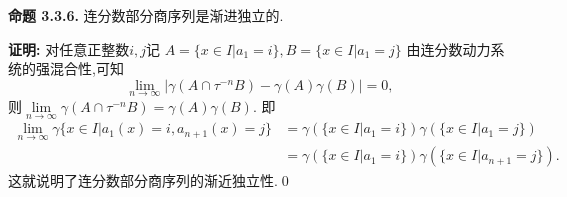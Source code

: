 \textbf{命题 3.3.6.  }\textsuperscript{\cite{Liu_Peng}}
连分数部分商序列是渐进独立的.
\par
\textbf{证明:  }
对任意正整数$i,j$记
$A=\{x\in I|a_1=i\},B=\{x\in I|a_1=j\}$
由连分数动力系统的强混合性,可知
$$\lim\limits_{n\to \infty}\left|\gamma(A\cap\tau^{-n}B)-\gamma(A)\gamma(B)\right|=0,$$
则$\lim\limits_{n\to \infty}\gamma(A\cap\tau^{-n}B)=\gamma(A)\gamma(B).$
即
\begin{align*}
    \lim\limits_{n\to \infty}\gamma\{x\in I|a_1(x)=i,a_{n+1}(x)=j\} & =\gamma(\{x\in I|a_1=i\})\gamma(\{x\in I|a_1=j\})      \\
                                                                    & =\gamma(\{x\in I|a_1=i\})\gamma(\{x\in I|a_{n+1}=j\}).
\end{align*}
这就说明了连分数部分商序列的渐近独立性.\qed

\sectionbreak